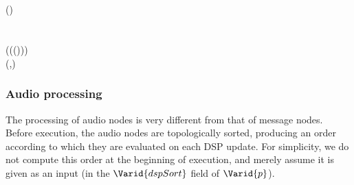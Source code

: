 \begin{hscode}\SaveRestoreHook
{}%
%
%
%
%
%
\>[B]{}\mathbin{::}\<[29]%
\>[29]{}\to {}\<[E]%
\\
\>[29]{}\<[E]%
\\
\>[29]{}\to {}\to {}\<[E]%
\\
\>[B]{}\;\;\;\;\mathrel{=}{}\<[E]%
\\
\>[B]{}\<[4]%
\>[4]{}\;\;\;(\;){}\<[E]%
\\
\>[B]{}\<[4]%
\>[4]{}\<[E]%
\\
\>[4]{}\<[7]%
\>[7]{}\mathbin{::}\to {}\to {}\to {}\<[E]%
\\
\>[4]{}\<[7]%
\>[7]{}\;\;\;(\;(\;\mathbin{:}(\;\mathbin{:}\anonymous ))\;\anonymous \;\anonymous ){}\<[E]%
\\
\>[7]{}\<[10]%
\>[10]{}\mid {}\equiv {}\mathrel{=}\;\;(,)\;\;\<[E]%
\\
\>[4]{}\<[7]%
\>[7]{}\;\;\anonymous \;\anonymous \mathrel{=}\<[E]%
\ColumnHook
\end{hscode}\resethooks

\subsubsection{Audio processing}

The processing of audio nodes is very different from that of message nodes.
Before execution, the audio nodes are topologically sorted, producing an
order according to which they are evaluated on each DSP update. For simplicity,
we do not compute this order at the beginning of execution, and merely assume
it is given as an input (in the \ensuremath{\Varid{dspSort}} field of \ensuremath{\Varid{p}}).

